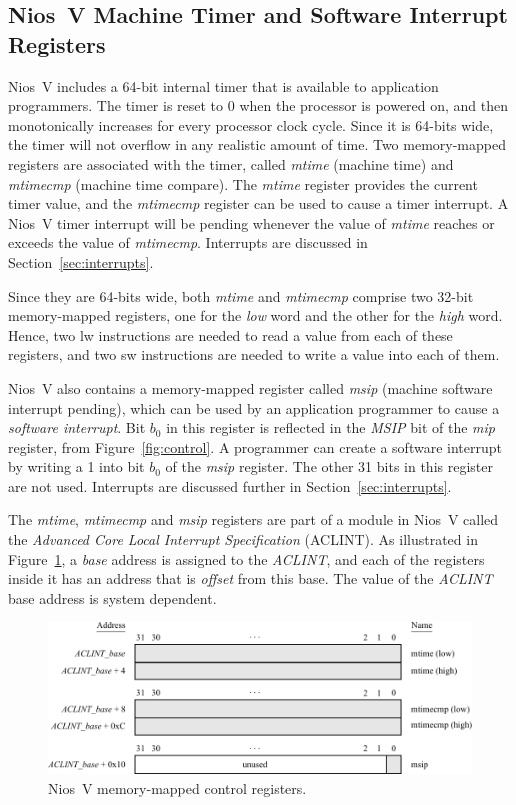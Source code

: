 \documentclass[11pt, twoside, pdftex]{article}
\begin{document}
\subsection{Nios~V Machine Timer and Software Interrupt Registers}
\label{sec:timer}
Nios~V includes a 64-bit internal timer that is available to application programmers. 
The timer is reset to 0 when the processor is powered on, and then monotonically
increases for every processor clock cycle. 
Since it is 64-bits wide, the timer will not overflow in any realistic amount
of time. Two memory-mapped registers are associated with the timer, called {\it mtime}
(machine time) and {\it mtimecmp} (machine time compare). The {\it mtime} register provides 
the current timer value, and the {\it mtimecmp} register can be used to cause a timer 
interrupt. A Nios~V timer interrupt will be pending whenever the value of {\it mtime} reaches or
exceeds the value of {\it mtimecmp}. Interrupts are discussed in Section~\ref{sec:interrupts}.

Since they are 64-bits wide, both {\it mtime} and {\it mtimecmp} comprise two 32-bit 
memory-mapped registers, one for the {\it low} word and the other for the {\it high} word. 
Hence, two {\sf lw} instructions are needed to read a value from each of these registers, and 
two {\sf sw} instructions are needed to write a value into each of them.

Nios~V also contains a memory-mapped register called {\it msip} (machine software interrupt
pending), which can be used by an application programmer to cause a 
{\it software interrupt}. Bit $b_0$ in this register is reflected in the {\it MSIP} bit of 
the {\it mip} register, from Figure~\ref{fig:control}. A programmer can create a software 
interrupt by writing a 1 into bit $b_0$ of the {\it msip} register. The other 31 bits 
in this register are not used. Interrupts are discussed further in Section~\ref{sec:interrupts}.

The {\it mtime}, {\it mtimecmp} and {\it msip} registers are part of a module in Nios~V called
the {\it Advanced Core Local Interrupt Specification} (ACLINT). As illustrated in 
Figure~\ref{fig:mm_control}, a {\it base} address is assigned to the {\it ACLINT}, and 
each of the registers inside it has an address that is {\it offset} from this base. The value of
the {\it ACLINT} base address is system dependent. 

\begin{figure}[h]
   \begin{center}
      \includegraphics[scale=.9]{figures/mm_control_registers.pdf}
   \caption{Nios~V memory-mapped control registers.} 
	 \label{fig:mm_control}
	 \end{center}
\end{figure}
\end{document}
